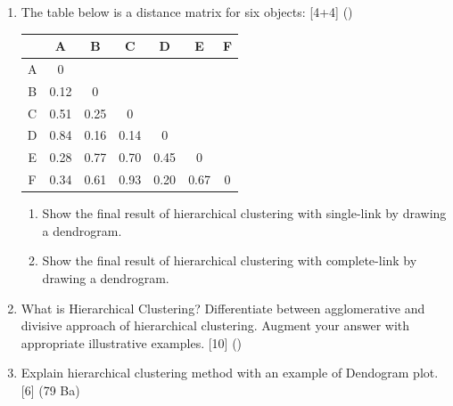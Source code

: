 \documentclass[12pt]{article}
\begin{document}
\begin{enumerate}[topsep=0pt, noitemsep]
      \item The table below is a distance matrix for six objects: \hfill [4+4] ()\\
        \small
        \begin{tabular}{|c|c|c|c|c|c|c|}
          \hline
           & A & B & C & D & E & F \\ \hline
          A & 0 & & & & & \\ \hline
          B & 0.12 & 0 & & & & \\ \hline
          C & 0.51 & 0.25 & 0 & & & \\ \hline
          D & 0.84 & 0.16 & 0.14 & 0 & & \\ \hline
          E & 0.28 & 0.77 & 0.70 & 0.45 & 0 & \\ \hline
          F & 0.34 & 0.61 & 0.93 & 0.20 & 0.67 & 0 \\ \hline
        \end{tabular}
        \normalsize
        \begin{enumerate}[label=(\alph*),topsep=2pt,noitemsep]
          \item Show the final result of hierarchical clustering with single-link by drawing a dendrogram.
          \item Show the final result of hierarchical clustering with complete-link by drawing a dendrogram.
        \end{enumerate}

      \item What is Hierarchical Clustering? Differentiate between agglomerative and divisive approach of hierarchical clustering. Augment your answer with appropriate illustrative examples. \hfill [10] ()

      \item Explain hierarchical clustering method with an example of Dendogram plot. \hfill [6] (79 Ba)
    \end{enumerate}
\end{document}
